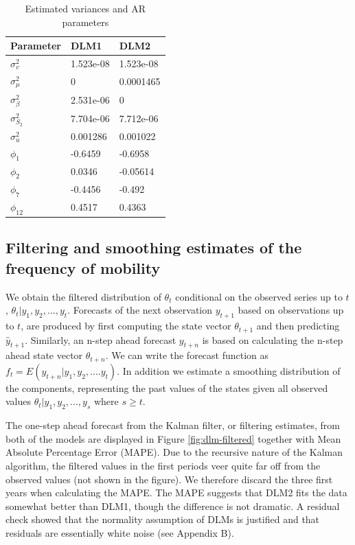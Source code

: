 \documentclass[12pt, a4paper]{article}
\begin{document}
\begin{table}[H]

\caption{\label{tab:estimated-parameters}Estimated variances and AR parameters}
\centering
\begin{tabular}{lll}
\toprule
Parameter & DLM1 & DLM2\\
\midrule
$\sigma_{v}^{2}$ & 1.523e-08 & 1.523e-08\\
$\sigma_{\mu}^{2}$ & 0 & 0.0001465\\
$\sigma_{\beta}^{2}$ & 2.531e-06 & 0\\
$\sigma_{S_{2}}^{2}$ & 7.704e-06 & 7.712e-06\\
$\sigma^{2}_{u}$ & 0.001286 & 0.001022\\
$\phi_{1}$ & -0.6459 & -0.6958\\
$\phi_{2}$ & 0.0346 & -0.05614\\
$\phi_{7}$ & -0.4456 & -0.492\\
$\phi_{12}$ & 0.4517 & 0.4363\\
\bottomrule
\end{tabular}
\end{table}

\subsection{Filtering and smoothing estimates of the frequency of
mobility}\label{filtering-and-smoothing-estimates-of-the-frequency-of-mobility}

We obtain the filtered distribution of $\theta_{t}$ conditional on the
observed series up to $t$, $\theta_{t} | y_{1}, y_{2},...,y_{t}$.
Forecasts of the next observation $y_{t+1}$ based on observations up
to $t$, are produced by first computing the state vector
$\theta_{t+1}$ and then predicting $\hat{y}_{t+1}$. Similarly, an n-step
ahead forecast $y_{t+n}$ is based on calculating the n-step ahead
state vector $\theta_{t+n}$. We can write the forecast function as
$f_{t} = E(y_{t+n} | y_{1}, y_{2}, ....y_{t})$. In addition we
estimate a smoothing distribution of the components, representing the
past values of the states given all observed values
$\theta_{t} | y_{1}, y_{2},...,y_{s}$ where $s \ge t$.

The one-step ahead forecast from the Kalman filter, or filtering estimates, from both of the models are displayed in Figure
\ref{fig:dlm-filtered} together with Mean Absolute Percentage Error (MAPE).
Due to the recursive nature of the Kalman algorithm, the filtered values
in the first periods veer quite far off from the observed values (not
shown in the figure). We therefore discard the three first years when
calculating the MAPE. The MAPE suggests that DLM2 fits the
data somewhat better than DLM1, though the difference is not
dramatic. A residual check showed that the normality assumption of
DLMs is justified and that residuals are essentially white noise (see Appendix B).
\end{document}
